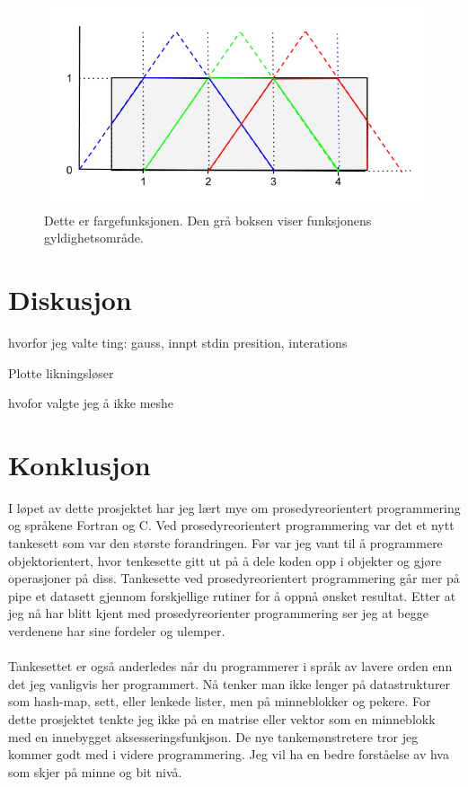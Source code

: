 \documentclass[10pt,a4paper, norsk]{article}
\begin{document}
\begin{figure}[h] 
\centering
\includegraphics[scale=0.5]{FargeFunksjon.png}  
\caption{Dette er fargefunksjonen. Den grå boksen viser funksjonens gyldighetsområde. }
\label{fig:farge}
\end{figure} 

\section{Diskusjon}




hvorfor jeg valte ting: gauss, innpt stdin  presition, interations

Plotte likningsløser

hvofor valgte jeg å ikke meshe



\section{Konklusjon}

I løpet av dette prosjektet har jeg lært mye om prosedyreorientert programmering og språkene Fortran og C. Ved prosedyreorientert programmering var det et nytt tankesett som var den største forandringen. Før var jeg vant til å programmere objektorientert, hvor tenkesette gitt ut på å dele koden opp i objekter og gjøre operasjoner på diss. Tankesette ved prosedyreorientert programmering  går mer på pipe et datasett gjennom forskjellige rutiner for å oppnå ønsket resultat. Etter at jeg nå har blitt kjent med prosedyreorienter programmering ser jeg at begge verdenene har sine fordeler og ulemper. 
 
\paragraph{} 
Tankesettet er også anderledes når du programmerer i språk av lavere orden enn det jeg vanligvis her programmert. Nå tenker man ikke lenger på datastrukturer som hash-map, sett, eller lenkede lister, men på minneblokker og pekere. For dette prosjektet tenkte jeg ikke på en matrise eller vektor som en minneblokk med en innebygget aksesseringsfunkjson. De nye tankemønstretere tror jeg kommer godt med i videre programmering. Jeg vil ha en bedre forståelse av hva som skjer på minne og bit nivå.  
\end{document}
